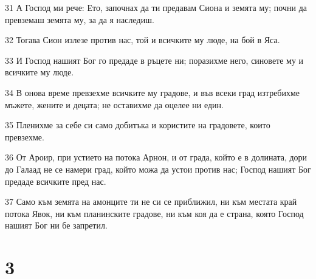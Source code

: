 \par 31 А Господ ми рече: Ето, започнах да ти предавам Сиона и земята му; почни да превземаш земята му, за да я наследиш.
\par 32 Тогава Сион излезе против нас, той и всичките му люде, на бой в Яса.
\par 33 И Господ нашият Бог го предаде в ръцете ни; поразихме него, синовете му и всичките му люде.
\par 34 В онова време превзехме всичките му градове, и във всеки град изтребихме мъжете, жените и децата; не оставихме да оцелее ни един.
\par 35 Пленихме за себе си само добитъка и користите на градовете, които превзехме.
\par 36 От Ароир, при устието на потока Арнон, и от града, който е в долината, дори до Галаад не се намери град, който можа да устои против нас; Господ нашият Бог предаде всичките пред нас.
\par 37 Само към земята на амонците ти не си се приближил, ни към местата край потока Явок, ни към планинските градове, ни към коя да е страна, която Господ нашият Бог ни бе запретил.

\chapter{3}

